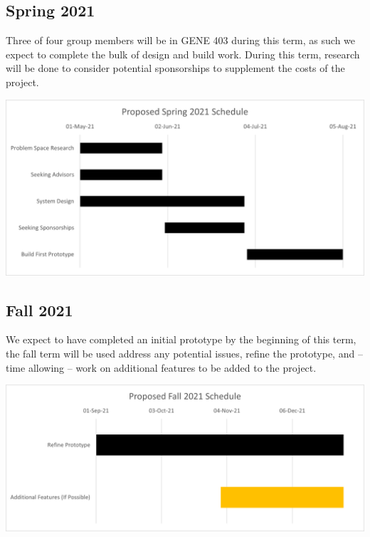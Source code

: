 \documentclass[a4paper,11pt]{article}
\begin{document}
\subsection{Spring 2021}
Three of four group members will be in GENE 403 during this term, as such we expect to complete the bulk of design and build work. During this term, research will be done to consider potential sponsorships to supplement the costs of the project.
\begin{center}
\includegraphics[scale=0.8]{S21.png}
\end{center}

\subsection{Fall 2021}
We expect to have completed an initial prototype by the beginning of this term, the fall term will be used address any potential issues, refine the prototype, and -- time allowing -- work on additional features to be added to the project.
\begin{center}
\includegraphics[scale=0.8]{F21.png}
\end{center}

\newpage
\end{document}
